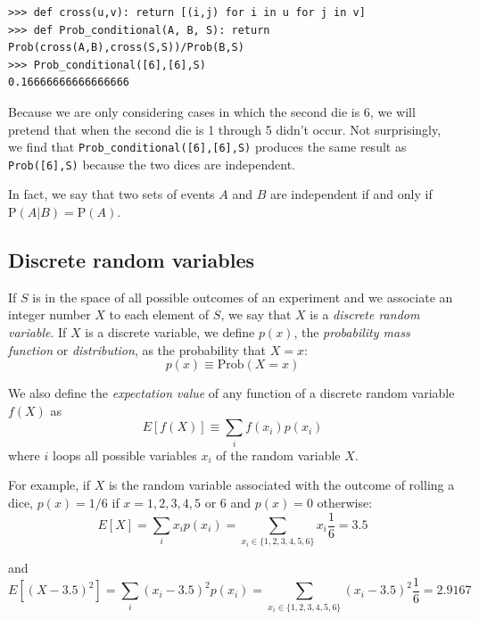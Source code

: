 \documentclass[justified,sixbynine]{tufte-book}
\def\ft{\small\tt}
\theoremstyle{plain}%
\theoremstyle{definition}
\theoremstyle{remark}
\begin{document}
\begin{fullwidth}
\begin{lstlisting}[caption={in file: {\ft nlib.py}}]
>>> def cross(u,v): return [(i,j) for i in u for j in v]
>>> def Prob_conditional(A, B, S): return Prob(cross(A,B),cross(S,S))/Prob(B,S)
>>> Prob_conditional([6],[6],S)
0.16666666666666666
\end{lstlisting}

Because we are only considering cases in which the second die is 6, we will pretend that when the second die is 1 through 5 didn't occur.
Not surprisingly, we find that {\ft Prob\_conditional([6],[6],S)} produces the same result as
{\ft Prob([6],S)} because the two dices are independent.

In fact, we say that two sets of events $A$ and $B$ are independent if and only if $\textrm{P}(A|B) = \textrm{P}(A)$.


\goodbreak\subsection{Discrete random variables}

If $S$ is in the space of all possible outcomes of an experiment and we
associate an integer number $X$ to each element of $S$, we say that $X$ is a
{\it discrete random variable}. If $X$ is a discrete variable, we define $%
p(x)$, the {\it probability mass function} or {\it distribution}, as the
probability that $X=x$:
\begin{equation}
p(x) \equiv \textrm{Prob}(X=x)
\end{equation}

We also define the {\it expectation value} of any function of a discrete
random variable $f(X)$ as
\begin{equation}
E[f(X)] \equiv  \sum_i f(x_i)p(x_i)
\end{equation}
where $i$ loops all possible variables $x_i$ of the random variable $X$.

For example, if $X$ is the random variable associated with the outcome of rolling a dice, $p(x)=1/6$ if $x=1,2,3,4,5$ or $6$ and $p(x)=0$ otherwise:
\begin{equation}
E[X]=\sum_ix_ip(x_i)=\sum_{x_i\in \{1,2,3,4,5,6\}}x_i\frac 16=3.5
\end{equation}

and
\begin{equation}
E[(X-3.5)^2]=\sum_i(x_i-3.5)^2p(x_i)=\sum_{x_i\in
\{1,2,3,4,5,6\}}(x_i-3.5)^2\frac 16=2.9167
\end{equation}


\end{fullwidth}
\end{document}

